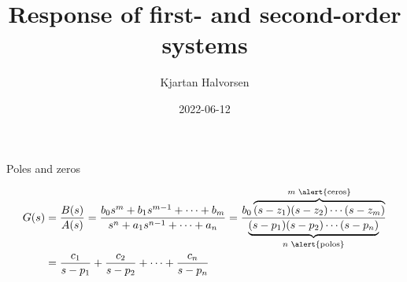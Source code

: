 \documentclass[dvisvgm,hypertex,aspectratio=169]{beamer}
\author{Kjartan Halvorsen}
\date{2022-06-12}
\title{Response of first- and second-order systems}
\begin{document}
\maketitle


\begin{frame}[label=PZ0]{Poles and zeros}

  \begin{align*}
    G(s) &= \frac{B(s)}{A(s)} = \frac{b_0s^m + b_1s^{m-1} + \cdots + b_m }{s^n + a_1s^{n-1} + \cdots + a_n } = \frac{ b_0\overbrace{(s-z_1)(s-z_2)\cdots (s-z_m)}^{\text{\(m\) \alert{ceros}}}}{ \underbrace{(s-p_1)(s-p_2)\cdots(s-p_n)}_{\text{\(n\) \alert{polos}}}}\\
    &= \frac{c_1}{s-p_1} + \frac{c_2}{s-p_2} + \cdots +\frac{c_n}{s-p_n} 
  \end{align*}
\end{frame}
\end{document}
